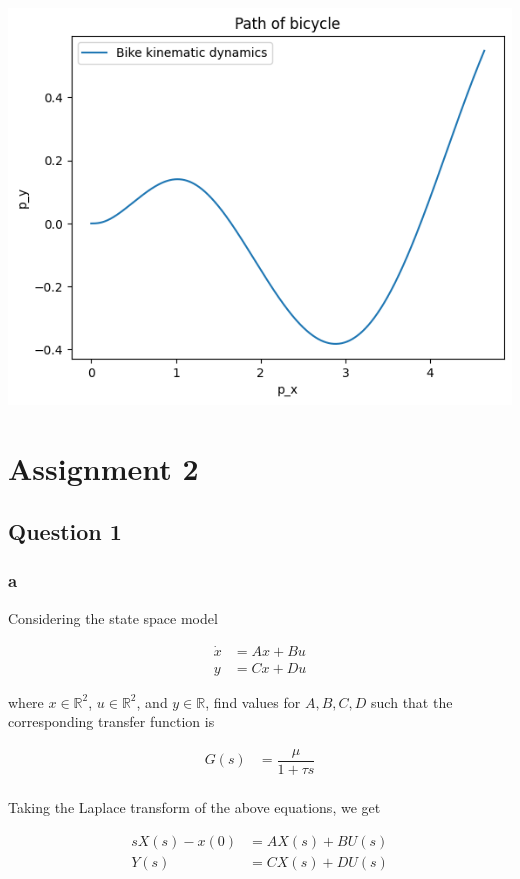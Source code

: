 \documentclass[11pt]{article}
\begin{document}
\includegraphics{a1.png}

\section{Assignment 2}

\subsection{Question 1}

\subsubsection{a}

Considering the state space model

\begin{align*}
    \dot{x} &= Ax + Bu \\
    y &= Cx + Du
\end{align*}

where $x \in \mathbb{R}^2$, $u \in \mathbb{R}^2$, and $y \in \mathbb{R}$, find values for $A, B, C, D$ such that the corresponding transfer function is

\begin{align*}
    G(s) &= \dfrac{\mu}{1 + \tau s} \\
\end{align*}

Taking the Laplace transform of the above equations, we get

\begin{align*}
    sX(s) - x(0) &= AX(s) + BU(s) \\
    Y(s) &= CX(s) + DU(s)
\end{align*}
\end{document}
